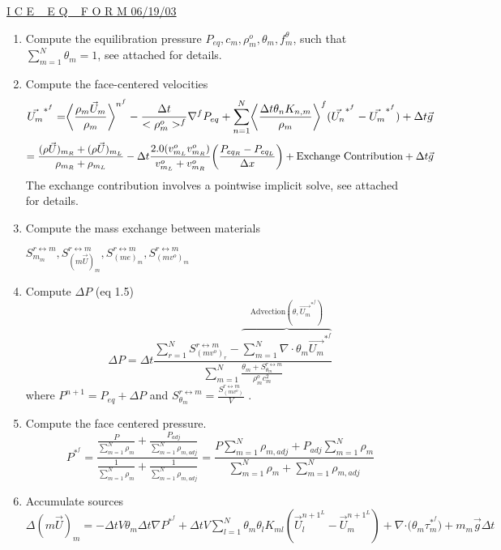 \documentclass[fleqn]{article}
\newcommand{\SUM}[1]    {\ensuremath{\sum \limits_{{#1}=1}^N }}
\newcommand{\bigS}[1]   {\ensuremath{S^{r \leftrightarrow m}_{#1}}  }
\newcommand{\B}[1]      {\biggr{#1}}
\newcommand{\U}         {{\vec{U}}}
\newcommand{\rhoM}      {\ensuremath{\rho^{o}_m}}
\newcommand{\delt}      {\ensuremath{\Delta{t}} }
\newcommand{\f}         {\ensuremath{f^{\theta}_m} }
\newcommand{\sv}[1]     {\ensuremath{v^o_{m_{#1}} }}
\begin{document}
\setlength{\abovedisplayskip}{0.1in}
\setlength{\mathindent}{0.0in}
\underline{ I C E  ~ E Q ~  F O R M  \hspace{ 0.5in}06/19/03}

\begin{enumerate}
\item Compute the equilibration pressure 
$P_{eq}, c_m, \rhoM, \theta_m, \f$, such that $\SUM{m}\theta_m = 1$, see attached for details.
\item Compute the face-centered velocities 
\[
    \vec{U_m}^{*^{f}} 
    = \B{<} \frac{ \rho_m \U_m }{\rho_m} \B{>}^{n^{f}}
%
    - \frac{ \delt }{< \rhoM >^f} \nabla^{f} P_{eq}
    + \SUM{n} \B{<} \frac{\delt \theta_n K_{n,m}}{\rho_m} \biggl{>}^f(\vec{U_n}^{*^{f}} - \vec{U_m}^{*^{f}})  
    + \delt\vec{g}
\]
\[    
   =\frac{(\rho \U)_{m_R} + (\rho \U)_{m_L}}{\rho_{m_R} + \rho_{m_L}}
%
   -\delt \frac{2.0 (\sv{L} \sv{R})}  {\sv{L} + \sv{R}}  \B{(} \frac{P_{eq_R} - P_{eq_L}}{\Delta x}\B{)}
   + \text{Exchange Contribution}
   + \delt\vec{g}
\]
The exchange contribution involves a pointwise implicit solve, see attached for details.
\item Compute the mass exchange between materials

$  \bigS{m_m},  \bigS{(m \U)_m}, \bigS{(m e)_m}, \bigS{(m v^o)_m }$
\item Compute $\Delta P$ (eq 1.5) 
\[
     \Delta P = \Delta t 
                        \frac{   \SUM{r}  \bigS{(m v^o)_r}
                      - \overbrace { \SUM{m} \nabla \cdot \theta_m \vec{U_m}^{*^{f}} } ^{\text{Advection}(\theta, \vec{U_m}^{*^{f}}) } }
                       {\SUM{m}  \frac{\theta_m +\bigS{\theta_m}  } {\rhoM c^2_m}}
\]
where $P^{n+1} = P_{eq} + \Delta{P}$ and $\bigS{\theta_m} = \frac{ \bigS{(m v^o)}}{V}$ .
\item Compute the face centered pressure.
\[
    P^{*^{f}} = \frac{\frac{P}{\SUM{m} \rho_m} + \frac{P_{adj}}{\SUM{m} \rho_{m, adj}}}
                     {\frac{1}{\SUM{m} \rho_m} + \frac{1}{\SUM{m} \rho_{m, adj}}}
%
              =\frac{ {P \SUM{m} \rho_{m,adj}} + {P_{adj} \SUM{m} \rho_{m} }  }
                 { {\SUM{m} \rho_m} + {\SUM{m} \rho_{m, adj}  }  }
\]
\item Accumulate sources\\  
 $\Delta(m\vec{U})_m = 
    - \delt V \theta_m\delt \nabla{ P^{*^f}} 
    + \delt V \SUM{l} \theta_m \theta_l K_{ml}(\U_l^{{n+1}^L} - \U_m^{{n+1}^L} )
    + \nabla{ \cdot (\theta_m \tau^{*^f}_m})
    + m_m \vec{g}\delt$
    

\end{enumerate}
\end{document}
